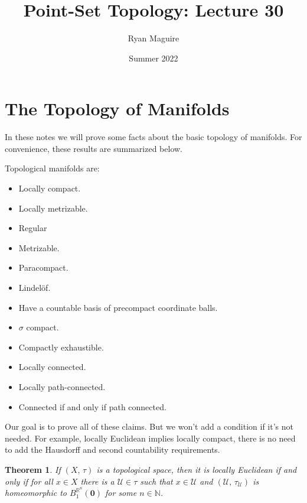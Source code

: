 \documentclass{article}
\title{Point-Set Topology: Lecture 30}
\author{Ryan Maguire}
\date{Summer 2022}
\theoremstyle{plain}
\newtheorem{theorem}{Theorem}[section]
\theoremstyle{normal}
\begin{document}
    \maketitle
    \section{The Topology of Manifolds}
        In these notes we will prove some facts about the basic topology of
        manifolds. For convenience, these results are summarized below.
        \par\hfill\par
        Topological manifolds are:
        \begin{itemize}
            \item Locally compact.
            \item Locally metrizable.
            \item Regular
            \item Metrizable.
            \item Paracompact.
            \item Lindel\"{o}f.
            \item Have a countable basis of precompact coordinate balls.
            \item $\sigma$ compact.
            \item Compactly exhaustible.
            \item Locally connected.
            \item Locally path-connected.
            \item Connected if and only if path connected.
        \end{itemize}
        Our goal is to prove all of these claims. But we won't add a condition
        if it's not needed. For example, locally Euclidean implies locally
        compact, there is no need to add the Hausdorff and second countability
        requirements.
        \begin{theorem}
            If $(X,\,\tau)$ is a topological space, then it is locally Euclidean
            if and only if for all $x\in{X}$ there is a $\mathcal{U}\in\tau$
            such that $x\in\mathcal{U}$ and
            $(\mathcal{U},\,\tau_{\mathcal{U}})$ is homeomorphic to
            $B_{1}^{\mathbb{R}^{n}}(\mathbf{0})$ for some $n\in\mathbb{N}$. 
        \end{theorem}
\end{document}
